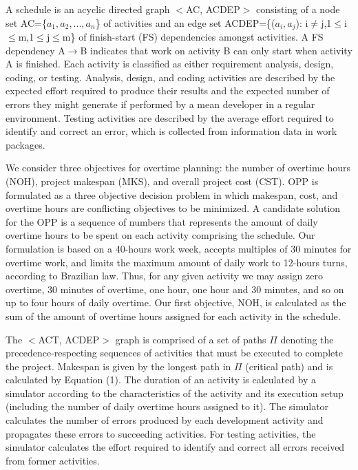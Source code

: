 \documentclass[conference]{IEEEtran}
\begin{document}
A schedule is an acyclic directed graph $<$AC, ACDEP$>$ consisting of a node set AC=\{$a_1, a_2, ..., a_n$\} of activities and an edge set ACDEP=\{($a_i, a_j$): i$\not=$j,1$\leq$i$\leq$m,1$\leq$j$\leq$m\} of finish-start (FS) dependencies amongst activities. A FS dependency A$\rightarrow$B indicates that work on activity B can only start when activity A is finished. Each activity is classified as either requirement analysis, design, coding, or testing. Analysis, design, and coding activities are described by the expected effort required to produce their results and the expected number of errors they might generate if performed by a mean developer in a regular environment. Testing activities are described by the average effort required to identify and correct an error, which is collected from information data in work packages.

We consider three objectives for overtime planning: the number of overtime hours (NOH), project makespan (MKS), and overall project cost (CST). OPP is formulated as a three objective decision problem in which makespan, cost, and overtime hours are conflicting objectives to be minimized. A candidate solution for the OPP is a sequence of numbers that represents the amount of daily overtime hours to be spent on each activity comprising the schedule. Our formulation is based on a 40-hours work week, accepts multiples of 30 minutes for overtime work, and limits the maximum amount of daily work to 12-hours turns, according to Brazilian law. Thus, for any given activity we may assign zero overtime, 30 minutes of overtime, one hour, one hour and 30 minutes, and so on up to four hours of daily overtime. Our first objective, NOH, is calculated as the sum of the amount of overtime hours assigned for each activity in the schedule.

The $<$ACT, ACDEP$>$ graph is comprised of a set of paths $\Pi$ denoting the precedence-respecting sequences of activities that must be executed to complete the project. Makespan is given by the longest path in $\Pi$ (critical path) and is calculated by Equation (1). The duration of an activity is calculated by a simulator according to the characteristics of the activity and its execution setup (including the number of daily overtime hours assigned to it). The simulator calculates the number of errors produced by each development activity and propagates these errors to succeeding activities. For testing activities, the simulator calculates the effort required to identify and correct all errors received from former activities.
\end{document}
